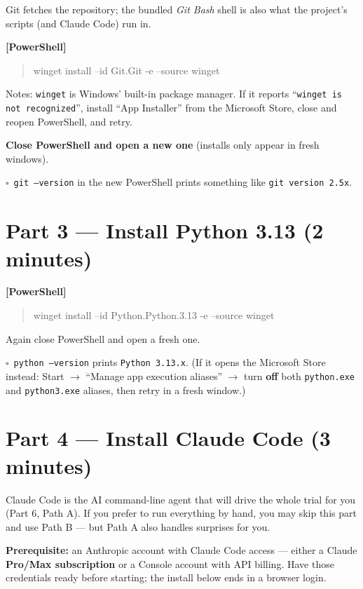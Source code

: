 \documentclass[11pt]{article}
\newenvironment{cmdblock}{\begin{quote}\small\begin{ttfamily}}{\end{ttfamily}\end{quote}}
\newcommand{\checkbox}{$\square$~}
\begin{document}
Git fetches the repository; the bundled \emph{Git Bash} shell is also what the
project's scripts (and Claude Code) run in.

\textbf{[PowerShell]}
\begin{cmdblock}
winget install --id Git.Git -e --source winget
\end{cmdblock}

Notes: \texttt{winget} is Windows' built-in package manager. If it reports
``\texttt{winget is not recognized}'', install ``App Installer'' from the Microsoft
Store, close and reopen PowerShell, and retry.

\textbf{Close PowerShell and open a new one} (installs only appear in fresh windows).

\checkbox \texttt{git --version} in the new PowerShell prints something like
\texttt{git version 2.5x}.

\section*{Part 3 --- Install Python 3.13 (2 minutes)}

\textbf{[PowerShell]}
\begin{cmdblock}
winget install --id Python.Python.3.13 -e --source winget
\end{cmdblock}

Again close PowerShell and open a fresh one.

\checkbox \texttt{python --version} prints \texttt{Python 3.13.x}.
(If it opens the Microsoft Store instead: Start $\rightarrow$ ``Manage app execution
aliases'' $\rightarrow$ turn \textbf{off} both \texttt{python.exe} and
\texttt{python3.exe} aliases, then retry in a fresh window.)

\section*{Part 4 --- Install Claude Code (3 minutes)}

Claude Code is the AI command-line agent that will drive the whole trial for you
(Part 6, Path A). If you prefer to run everything by hand, you may skip this part
and use Path B --- but Path A also handles surprises for you.

\textbf{Prerequisite:} an Anthropic account with Claude Code access --- either a
Claude \textbf{Pro/Max subscription} or a Console account with API billing. Have
those credentials ready before starting; the install below ends in a browser login.
\end{document}
